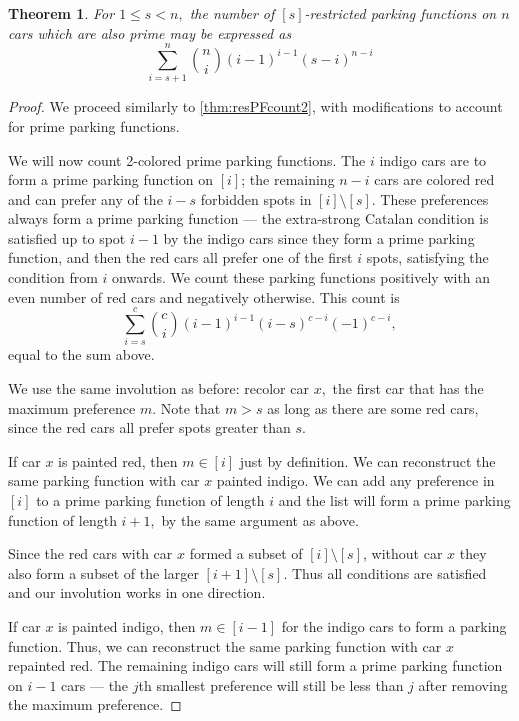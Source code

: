 \documentclass[12 pt]{amsart}
\newtheorem{theorem}{Theorem}[section]
\theoremstyle{definition} %
\theoremstyle{remark} %
\begin{document}
\begin{theorem}
    \label{thm:resPPFcount2}
    For $1 \le s < n,$ the number of $[s]$-restricted parking functions on $n$ cars which are also prime may be expressed as
    \[\sum_{i = s + 1}^{n} \binom{n}{i} (i - 1)^{i - 1} (s - i)^{n - i}\]
\end{theorem}

\begin{proof}
    We proceed similarly to \cref{thm:resPFcount2}, with modifications to account for prime parking functions.
    
    We will now count 2-colored prime parking functions. The $i$ indigo cars are to form a prime parking function on $[i]$; the remaining $n - i$ cars are colored red and can prefer any of the $i - s$ forbidden spots in  $[i] \setminus [s]$. These preferences always form a prime parking function --- the extra-strong Catalan condition is satisfied up to spot $i-1$ by the indigo cars since they form a prime parking function, and then the red cars all prefer one of the first $i$ spots, satisfying the condition from $i$ onwards. We count these parking functions positively with an even number of red cars and negatively otherwise. This count is
	\[
		\sum_{i = s}^{c} \binom{c}{i} (i - 1)^{i - 1} (i - s)^{c - i} (-1)^{c - i},
	\]
	equal to the sum above.

	We use the same involution as before: recolor car $x,$ the first car that has the maximum preference $m.$ Note that $m > s$ as long as there are some red cars, since the red cars all prefer spots greater than $s$.

	If car $x$ is painted red, then  $m \in [i]$ just by definition. We can reconstruct the same parking function with car $x$ painted indigo. We can add any preference in $[i]$ to a prime parking function of length $i$ and the list will form a prime parking function of length $i + 1,$ by the same argument as above.
    
    Since the red cars with car $x$ formed a subset of $[i] \setminus [s]$, without car $x$ they also form a subset of the larger $[i + 1] \setminus [s]$. Thus all conditions are satisfied and our involution works in one direction.

	If car $x$ is painted indigo, then $m\in [i-1]$ for the indigo cars to form a parking function. Thus, we can reconstruct the same parking function with car $x$ repainted red. The remaining indigo cars will still form a prime parking function on $i - 1$ cars --- the $j$th smallest preference will still be less than $j$ after removing the maximum preference.
    

\end{proof}
\end{document}
